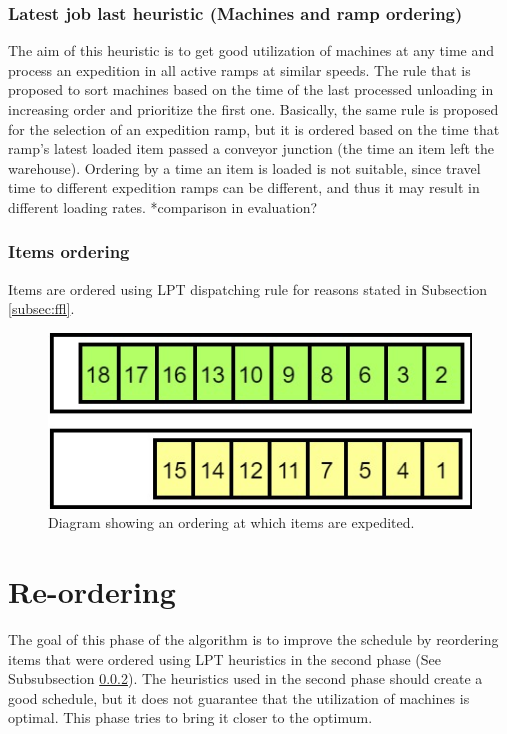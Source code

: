 \documentclass{ctuthesis}
\begin{document}
\subsubsection{Latest job last heuristic (Machines and ramp ordering)}

The aim of this heuristic is to get good utilization of machines at any time and process an expedition in all active ramps at similar speeds. The rule that is proposed to sort machines based on the time of the last processed unloading in increasing order and prioritize the first one. 
Basically, the same rule is proposed for the selection of an expedition ramp, but it is ordered based on the time that ramp's latest loaded item passed a conveyor junction (the time an item left the warehouse). Ordering by a time an item is loaded is not suitable, since travel time to different expedition ramps can be different, and thus it may result in different loading rates. *comparison in evaluation?

\subsubsection{Items ordering}
\label{subsubsec:itemsordering}

Items are ordered using LPT dispatching rule for reasons stated in Subsection \ref{subsec:ffl}.


\begin{figure}[h]
\includegraphics[width=0.8\linewidth]{order.jpg}
\caption{Diagram showing an ordering at which items are expedited.}
\label{order}
\end{figure}

\section{Re-ordering}

The goal of this phase of the algorithm is to improve the schedule by reordering items that were ordered using LPT heuristics in the second phase (See Subsubsection \ref{subsubsec:itemsordering}). The heuristics used in the second phase should create a good schedule, but it does not guarantee that the utilization of machines is optimal. This phase tries to bring it closer to the optimum.
\end{document}
